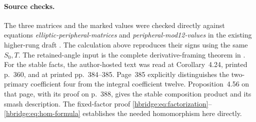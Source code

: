 \documentclass[11pt,letterpaper]{article}
\numberwithin{equation}{section}
\theoremstyle{definition}
\theoremstyle{remark}
\begin{document}
\paragraph{Source checks.}
The three matrices and the marked values were checked directly
against equations \emph{elliptic-peripheral-matrices} and
\emph{peripheral-mod12-values} in the existing higher-rung draft
\cite{hbridgebib:HBHigher}. The calculation above reproduces their signs
using the same \(S_0,T\). The retained-angle input is the
complete derivative-framing theorem in \cite{hbridgebib:HBRetained}.
For the stable facts, the author-hosted text
\cite{hbridgebib:HBHatcher} was read at Corollary~4.24, printed p.~360,
and at printed pp.~384--385. Page~385 explicitly distinguishes
the two-primary coefficient four from the integral coefficient
twelve. Proposition~4.56 on that page, with its proof on
p.~388, gives the stable composition product and its smash
description. The fixed-factor proof
\eqref{hbridge:eq:factorization}--\eqref{hbridge:eq:hom-formula}
establishes the needed homomorphism here directly.



\end{document}
